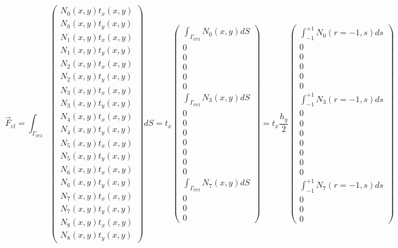 \[
\vec{F}_{el}=
\int_{\Gamma_{073}} 
\left(
\begin{array}{c}
N_0(x,y) t_x(x,y)\\
N_0(x,y) t_y(x,y)\\
N_1(x,y) t_x(x,y)\\
N_1(x,y) t_y(x,y)\\
N_2(x,y) t_x(x,y)\\
N_2(x,y) t_y(x,y)\\
N_3(x,y) t_x(x,y)\\
N_3(x,y) t_y(x,y)\\
N_4(x,y) t_x(x,y)\\
N_4(x,y) t_y(x,y)\\
N_5(x,y) t_x(x,y)\\
N_5(x,y) t_y(x,y)\\
N_6(x,y) t_x(x,y)\\
N_6(x,y) t_y(x,y)\\
N_7(x,y) t_x(x,y)\\
N_7(x,y) t_y(x,y)\\
N_8(x,y) t_x(x,y)\\
N_8(x,y) t_y(x,y)
\end{array}
\right)
dS
=
t_x 
\left(
\begin{array}{c}
\int_{\Gamma_{073}} N_0(x,y) dS\\
0 \\
0 \\
0 \\
0 \\
0 \\
\int_{\Gamma_{073}} N_3(x,y) dS \\
0 \\
0 \\
0 \\
0 \\
0 \\
0 \\
0 \\
\int_{\Gamma_{073}}  N_7(x,y) dS \\
0 \\
0 \\
0
\end{array}
\right)
=
t_x  \frac{h_y}{2}
\left(
\begin{array}{c}
\int_{-1}^{+1} N_0(r=-1,s) ds\\
0 \\
0 \\
0 \\
0 \\
0 \\
\int_{-1}^{+1} N_3(r=-1,s) ds \\
0 \\
0 \\
0 \\
0 \\
0 \\
0 \\
0 \\
\int_{-1}^{+1}  N_7(r=-1,s) ds \\
0 \\
0 \\
0
\end{array}
\right)
\]
